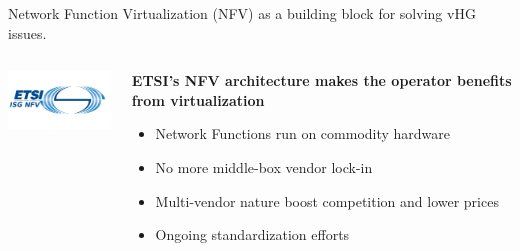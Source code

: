 \documentclass[a4paper]{beamer}
\begin{document}
\begin{frame}{Network Function Virtualization (NFV) as a building block for solving vHG issues.}
	\begin{columns}[T]
		\begin{column}[T]{0.33 \textwidth} 
			\vspace{5em}
			\includegraphics[width=10em]{etsinfv.png}
		\end{column}
										
		\begin{column}[T]{0.66\textwidth} 
										   
			\textbf{ETSI's NFV architecture makes the operator benefits from virtualization}
			\begin{itemize}
				\item Network Functions run on commodity hardware
				\item No more middle-box vendor lock-in
				\item Multi-vendor nature boost competition and lower prices
				\item Ongoing standardization efforts
			\end{itemize}
			\vspace{3mm}
																																						
		\end{column}
																										
	\end{columns}
\end{frame}
\end{document}
